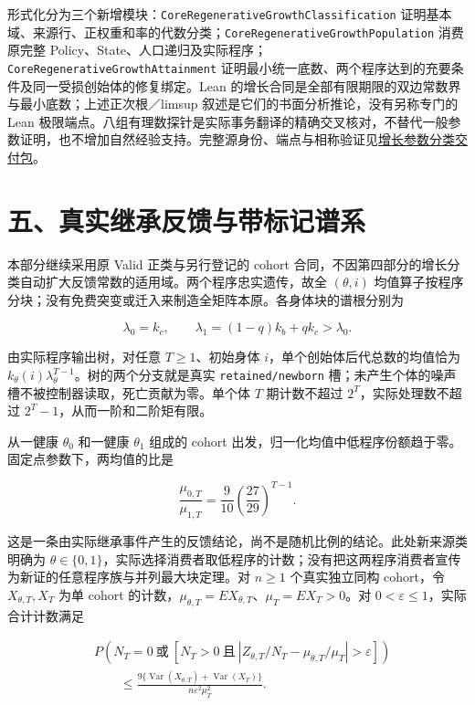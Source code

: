 \documentclass[
  11pt,
  oneside]{book}
\begin{document}
形式化分为三个新增模块：\nolinkurl{CoreRegenerativeGrowthClassification} 证明基本域、来源行、正权重和率的代数分类；\nolinkurl{CoreRegenerativeGrowthPopulation} 消费原完整 Policy、State、人口递归及实际程序；\nolinkurl{CoreRegenerativeGrowthAttainment} 证明最小统一底数、两个程序达到的充要条件及同一受损创始体的修复绑定。Lean 的增长合同是全部有限期限的双边常数界与最小底数；上述正次根／limsup 叙述是它们的书面分析推论，没有另称专门的 Lean 极限端点。八组有理数探针是实际事务翻译的精确交叉核对，不替代一般参数证明，也不增加自然经验支持。完整源身份、端点与相称验证见\href{../formalization/ueot-core/docs/compression/theory_completion/unified_closure/core_growth_classification_v1/README.md}{增长参数分类交付包}。

\section{五、真实继承反馈与带标记谱系}\label{ux4e94ux771fux5b9eux7ee7ux627fux53cdux9988ux4e0eux5e26ux6807ux8bb0ux8c31ux7cfb}

本部分继续采用原 Valid 正类与另行登记的 cohort 合同，不因第四部分的增长分类自动扩大反馈常数的适用域。两个程序忠实遗传，故全 \((\theta,i)\) 均值算子按程序分块；没有免费突变或迁入来制造全矩阵本原。各身体块的谱根分别为

\[\lambda_0=k_c,\qquad \lambda_1=(1-q)k_b+qk_c>\lambda_0.\]

由实际程序输出树，对任意 \(T\ge1\)、初始身体 \(i\)，单个创始体后代总数的均值恰为 \(k_\theta(i)\lambda_\theta^{T-1}\)。树的两个分支就是真实 \nolinkurl{retained/newborn} 槽；未产生个体的噪声槽不被控制器读取，死亡贡献为零。单个体 \(T\) 期计数不超过 \(2^T\)，实际处理数不超过 \(2^T-1\)，从而一阶和二阶矩有限。

从一健康 \(\theta_0\) 和一健康 \(\theta_1\) 组成的 cohort 出发，归一化均值中低程序份额趋于零。固定点参数下，两均值的比是

\[\frac{\mu_{0,T}}{\mu_{1,T}}=\frac9{10}\left(\frac{27}{29}\right)^{T-1}.\]

这是一条由实际继承事件产生的反馈结论，尚不是随机比例的结论。此处新来源类明确为 \(\theta\in\{0,1\}\)，实际选择消费者取低程序的计数；没有把这两程序消费者宣传为新证的任意程序族与并列最大块定理。对 \(n\ge1\) 个真实独立同构 cohort，令 \(X_{\theta,T},X_T\) 为单 cohort 的计数，\(\mu_{\theta,T}=E X_{\theta,T}\)、\(\mu_T=E X_T>0\)。对 \(0<\varepsilon\le1\)，实际合计计数满足

\[\begin{aligned}
&P\!\left(N_T=0\ \text{或}\ \left[N_T>0\ \text{且}\
\left|Z_{\theta,T}/N_T-\mu_{\theta,T}/\mu_T\right|>\varepsilon\right]\right)\\
&\qquad\le\frac{9\{\operatorname{Var}(X_{\theta,T})+\operatorname{Var}(X_T)\}}
{n\varepsilon^2\mu_T^2}.
\end{aligned}\]
\end{document}

